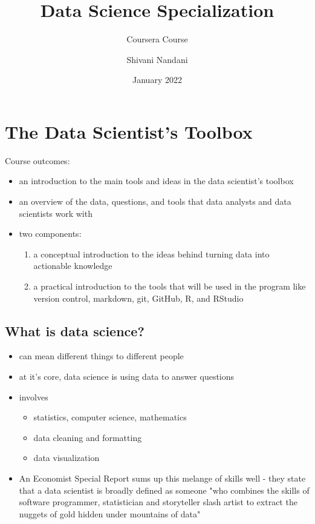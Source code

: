 \documentclass[11pt,fancy]{elegantbook}
\title{Data Science Specialization}
\subtitle{Coursera Course}
\author{Shivani Nandani}
\institute{Johns Hopkins University}
\date{January 2022}
\begin{document}
\maketitle

\frontmatter
\tableofcontents

\mainmatter

\chapter{The Data Scientist\rq s Toolbox}
Course\cite{course1} outcomes:
\begin{itemize}
    \item an introduction to the main tools and ideas in the data scientist's toolbox
    \item an overview of the data, questions, and tools that data analysts and data scientists work with
    \item two components:
          \begin{enumerate}
              \item a conceptual introduction to the ideas behind turning data into actionable knowledge
              \item a practical introduction to the tools that will be used in the program like version control, markdown, git, GitHub, R, and RStudio
          \end{enumerate}
\end{itemize}

\section{What is data science?}
\begin{itemize}
    \item can mean different things to different people
    \item at it's core, data science is using data to answer questions
    \item involves
          \begin{itemize}
              \item statistics, computer science, mathematics
              \item data cleaning and formatting
              \item data visualization
          \end{itemize}
    \item An Economist Special Report sums up this melange of skills well - they state that a data scientist is broadly defined as someone "who combines the skills of software programmer, statistician and storyteller slash artist to extract the nuggets of gold hidden under mountains of data"
\end{itemize}
\end{document}
